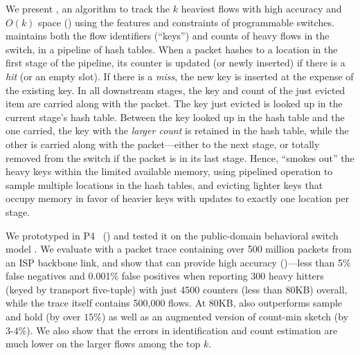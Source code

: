 We present \TheSystem,  an algorithm to track the $k$ heaviest flows with high
accuracy and $O(k)$ space () using the features and constraints of programmable switches. \TheSystem maintains both the
flow identifiers (``keys'') and counts of heavy flows in the switch, in a
pipeline of hash tables. 
When a packet hashes to a location in the first stage of the pipeline,
its counter is updated (or newly inserted) if there is a {\em hit} (or an empty
slot). If there is a {\em miss}, the new key is inserted at the expense of the
existing key. In all downstream stages, the key and count of the just evicted item are carried along with the packet. The key just evicted is looked up in the current stage's hash table. Between the key looked up in the hash table and the one carried, the key with the {\em larger count} is retained in the hash
table, while the other is carried along with the packet---either to the next
stage, or totally removed from the switch if the packet is in its last
stage. Hence, \TheSystem ``smokes out'' the heavy keys within the limited
available memory, using pipelined operation to sample multiple locations in the
hash tables, and evicting lighter keys that occupy memory in favor of heavier
keys with updates to exactly one location per stage. %

We prototyped \TheSystem  in P4~\cite{bosshart2014p4} () and
tested it on the public-domain behavioral switch model \cite{p4-bm}. %
We evaluate \TheSystem with a packet trace containing over 500 million packets
from an ISP backbone link, and show that \TheSystem can provide high accuracy
()---less than 5\% false negatives and 0.001\% false
positives when reporting 300 heavy hitters (keyed by transport five-tuple) with
just 4500 counters (less than 80KB) overall, while the trace itself contains 500,000 flows. At 80KB, \TheSystem also outperforms sample and hold (by over $15\%$) as well as an augmented version of count-min sketch (by $3$-$4\%$).  We
also show that the errors in identification and count estimation are much lower
on the larger flows among the top $k$.

